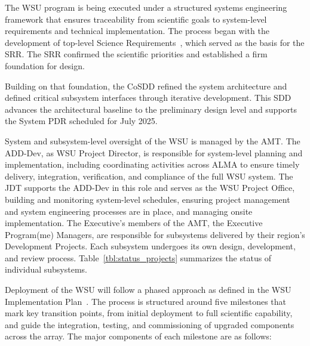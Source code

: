 The WSU program is being executed under a structured systems engineering framework that ensures traceability from scientific goals to system-level requirements and technical implementation. The process began with the development of top-level Science Requirements~\cite{sci_specs}, which served as the basis for the \ac{SRR}. The \ac{SRR} confirmed the scientific priorities and established a firm foundation for design.

Building on that foundation, the \ac{CoSDD} refined the system architecture and defined critical subsystem interfaces through iterative development. This \ac{SDD} advances the architectural baseline to the preliminary design level and supports the System \ac{PDR} scheduled for July 2025. 


System and subsystem-level oversight of the WSU is managed by the \ac{AMT}. The \ac{ADD-Dev}, as WSU Project Director, is responsible for system-level planning and implementation, including coordinating activities across ALMA to ensure timely delivery, integration, verification, and compliance of the full WSU system. The \ac{JDT} supports the \ac{ADD-Dev} in this role and serves as the WSU Project Office, building and monitoring system-level schedules, ensuring project management and system engineering processes are in place, and managing onsite implementation. The Executive's members of the AMT, the Executive Program(me) Managers, are responsible for  subsystems delivered by their region's Development Projects.  Each subsystem undergoes its own design, development, and review process. Table~\ref{tbl:status_projects} summarizes the status of individual subsystems.



Deployment of the WSU will follow a phased approach as defined in the WSU Implementation Plan~\cite{imp_plan_b}. The process is structured around five milestones that mark key transition points, from initial deployment to full scientific capability, and guide the integration, testing, and commissioning of upgraded components across the array. The major components of each milestone are as follows:

